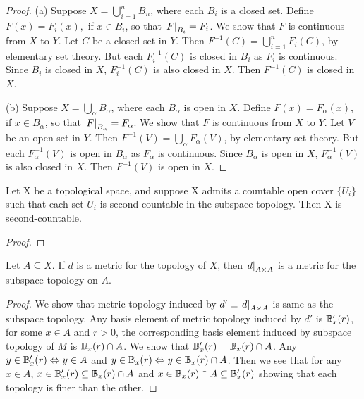 \documentclass[11pt,a4paper]{article}
\begin{document}
\begin{proof}
(a) Suppose $X = \bigcup_{i=1}^n B_n$, where each $B_i$ is a closed set. Define $F(x) = F_i(x),$ if $x\in B_i$, so that $\left.F\right|_{B_i} = F_i$. We show that $F$ is continuous from $X$ to $Y$. Let $C$ be a closed set in $Y$. Then $F^{-1}(C) = \bigcup_{i=1}^n F_i(C)$, by elementary set theory. But each $F_i^{-1}(C)$ is closed in $B_i$ as $F_i$ is continuous. Since $B_i$ is closed in $X$, $F_i^{-1}(C)$ is also closed in $X$. Then $F^{-1}(C)$ is closed in $X$.

\noindent(b) Suppose $X = \bigcup_\alpha B_\alpha$, where each $B_\alpha$ is open in $X$. Define $F(x) = F_\alpha(x),$ if $x\in B_\alpha$, so that $\left.F\right|_{B_\alpha} = F_\alpha$. We show that $F$ is continuous from $X$ to $Y$. Let $V$ be an open set in $Y$. Then $F^{-1}(V) = \bigcup_\alpha F_\alpha(V)$, by elementary set theory. But each $F_\alpha^{-1}(V)$ is open in $B_\alpha$ as $F_\alpha$ is continuous. Since $B_\alpha$ is open in $X$, $F_\alpha^{-1}(V)$ is also closed in $X$. Then $F^{-1}(V)$ is open in $X$.
\end{proof}

\begin{proposition}
    Let X be a topological space, and suppose X admits a countable open cover $\{U_i\}$ such that each set $U_i$ is second-countable in the subspace topology. Then X is second-countable.
\end{proposition}

\begin{proof}
    
\end{proof}

\begin{proposition}
Let $A\subseteq X$. If $d$ is a metric for the topology of $X$, then $\left.d\right|_{A\times A}$ is a metric for the subspace topology on $A$.
\end{proposition}

\begin{proof}
We show that metric topology induced by $d'\equiv \left.d\right|_{A\times A}$ is same as the subspace topology. Any basis element of metric topology induced by $d'$ is $\mathbb{B}'_x(r)$, for some $x\in A$ and $r>0$, the corresponding basis element induced by subspace topology of $M$ is $\mathbb{B}_x(r)\cap A$. We show that $\mathbb{B}'_x(r) = \mathbb{B}_x(r)\cap A$. Any $y\in \mathbb{B}'_x(r) \Leftrightarrow y\in A$ and $y\in \mathbb{B}_x(r) \Leftrightarrow y\in \mathbb{B}_x(r)\cap A$. Then we see that for any $x\in A$, $x\in \mathbb{B}'_x(r)\subseteq \mathbb{B}_x(r)\cap A$ and $x\in \mathbb{B}_x(r)\cap A\subseteq \mathbb{B}'_x(r)$ showing that each topology is finer than the other.
\end{proof}
\end{document}
